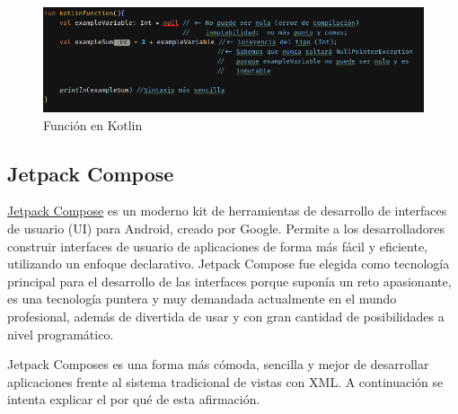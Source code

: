 \begin{figure}[h]
	\centering
	\includegraphics[width = 1\textwidth]{Imagenes/Fuentes/kotlinFun.png}
	\caption{Función en Kotlin}
	\label{fig:kotlinFun}
\end{figure}

\hypertarget{subsec:compose}{}
\subsection{Jetpack Compose}
\href{https://developer.android.com/develop/ui/compose}{Jetpack Compose} es un moderno kit de herramientas de desarrollo de interfaces de usuario (UI) para Android, creado por Google. Permite a los desarrolladores construir interfaces de usuario de aplicaciones de forma más fácil y eficiente, utilizando un enfoque declarativo. Jetpack Compose fue elegida como tecnología principal para el desarrollo de las interfaces porque suponía un reto apasionante, es una tecnología puntera y muy demandada actualmente en el mundo profesional, además de divertida de usar y con gran cantidad de posibilidades a nivel programático. 

Jetpack Composes es una forma más cómoda, sencilla y mejor de desarrollar aplicaciones frente al sistema tradicional de vistas con XML. A continuación se intenta explicar el por qué de esta afirmación.
